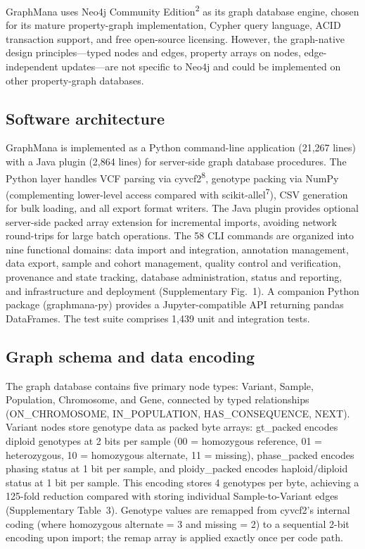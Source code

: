 \documentclass[11pt,a4paper]{article}
\newcommand{\citenum}[1]{\textsuperscript{#1}}
\begin{document}
GraphMana uses Neo4j Community Edition\citenum{2} as its graph database engine, chosen for its mature property-graph implementation, Cypher query language, ACID transaction support, and free open-source licensing. However, the graph-native design principles---typed nodes and edges, property arrays on nodes, edge-independent updates---are not specific to Neo4j and could be implemented on other property-graph databases.

\subsection*{Software architecture}

GraphMana is implemented as a Python command-line application (21,267 lines) with a Java plugin (2,864 lines) for server-side graph database procedures. The Python layer handles VCF parsing via cyvcf2\citenum{8}, genotype packing via NumPy (complementing lower-level access compared with scikit-allel\citenum{7}), CSV generation for bulk loading, and all export format writers. The Java plugin provides optional server-side packed array extension for incremental imports, avoiding network round-trips for large batch operations. The 58 CLI commands are organized into nine functional domains: data import and integration, annotation management, data export, sample and cohort management, quality control and verification, provenance and state tracking, database administration, status and reporting, and infrastructure and deployment (Supplementary Fig.~1). A companion Python package (graphmana-py) provides a Jupyter-compatible API returning pandas DataFrames. The test suite comprises 1,439 unit and integration tests.

\subsection*{Graph schema and data encoding}

The graph database contains five primary node types: Variant, Sample, Population, Chromosome, and Gene, connected by typed relationships (ON\_CHROMOSOME, IN\_POPULATION, HAS\_CONSEQUENCE, NEXT). Variant nodes store genotype data as packed byte arrays: gt\_packed encodes diploid genotypes at 2 bits per sample (00 = homozygous reference, 01 = heterozygous, 10 = homozygous alternate, 11 = missing), phase\_packed encodes phasing status at 1 bit per sample, and ploidy\_packed encodes haploid/diploid status at 1 bit per sample. This encoding stores 4 genotypes per byte, achieving a 125-fold reduction compared with storing individual Sample-to-Variant edges (Supplementary Table~3). Genotype values are remapped from cyvcf2's internal coding (where homozygous alternate = 3 and missing = 2) to a sequential 2-bit encoding upon import; the remap array is applied exactly once per code path.
\end{document}
